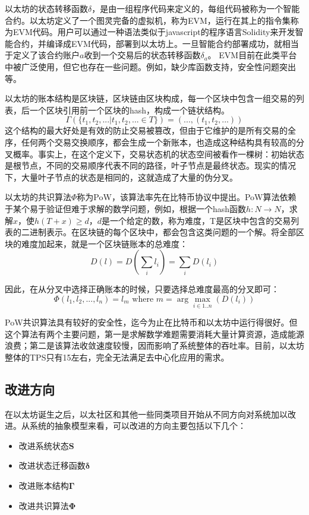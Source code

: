 \documentclass[UTF8,nofonts]{ctexart}
\begin{document}
\begin{multicols}{2}
以太坊的状态转移函数$\delta$，是由一组程序代码来定义的，每组代码被称为一个智能合约。以太坊定义了一个图灵完备的虚拟机，称为EVM，运行在其上的指令集称为EVM代码。用户可以通过一种语法类似于javascript的程序语言Solidity来开发智能合约，并编译成EVM代码，部署到以太坊上\cite{dannen2017introducing}。一旦智能合约部署成功，就相当于定义了该合约账户$a$收到一个交易后的状态转移函数$\delta_{a}$。
EVM目前在此类平台中被广泛使用，但它也存在一些问题。例如，缺少库函数支持，安全性问题突出等。

以太坊的账本结构是区块链\cite{nakamoto2008bitcoin}，区块链由区块构成，每一个区块中包含一组交易的列表，后一个区块引用前一个区块的hash，构成一个链状结构。
\begin{equation}
\Gamma(\lbrace t_{1}, t_{2},...\vert t_{1}, t_{2},... \in T \rbrace) = (..., (t_{1}, t_{2},...)) 
\end{equation}
这个结构的最大好处是有效的防止交易被篡改，但由于它维护的是所有交易的全序，任何两个交易交换顺序，都会生成一个新账本，也造成这种结构具有较高的分叉概率。事实上，在这个定义下，交易状态机的状态空间被看作一棵树：初始状态是根节点，不同的交易顺序代表不同的路径，叶子节点是最终状态。现实的情况下，大量叶子节点的状态是相同的，这就造成了大量的伪分叉。

以太坊的共识算法$\Phi$称为PoW，该算法率先在比特币协议中提出\cite{nakamoto2008bitcoin}。PoW算法依赖于某个易于验证但难于求解的数学问题，例如，根据一个hash函数$h:N \rightarrow N$，求解$x$，使$h(T+x) \geq d$，$d$是一个给定的数，称为难度，T是区块中包含的交易列表的二进制表示。在区块链的每个区块中，都会包含这类问题的一个解。将全部区块的难度加起来，就是一个区块链账本的总难度：
\begin{equation}
D(l) = D(\sum_{i} l_{i}) = \sum_{i} D(l_{i})
\end{equation}

因此，在从分叉中选择正确账本的时候，只要选择总难度最高的分叉即可：
\begin{equation}
 \Phi (l_{1}, l_{2}, ..., l_{n}) = l_{m} \text{ where } m = \arg\max_{i \in 1..n}(D(l_{i}))
\end{equation}

PoW共识算法具有较好的安全性，迄今为止在比特币和以太坊中运行得很好。但这个算法有两个主要问题，第一是求解数学难题需要消耗大量计算资源，造成能源浪费；第二是该算法收敛速度较慢，因而影响了系统整体的吞吐率。目前，以太坊整体的TPS只有15左右，完全无法满足去中心化应用的需求。

\subsection{改进方向}
在以太坊诞生之后，以太社区和其他一些同类项目开始从不同方向对系统加以改进。从系统的抽象模型来看，可以改进的方向主要包括以下几个：
\begin{itemize}
	\item 改进系统状态$\boldsymbol{S}$	
	\item 改进状态迁移函数$\boldsymbol{\delta}$	
	\item 改进账本结构$\boldsymbol{\Gamma}$
	\item 改进共识算法$\boldsymbol{\Phi}$
\end{itemize}


\end{multicols}
\end{document}
